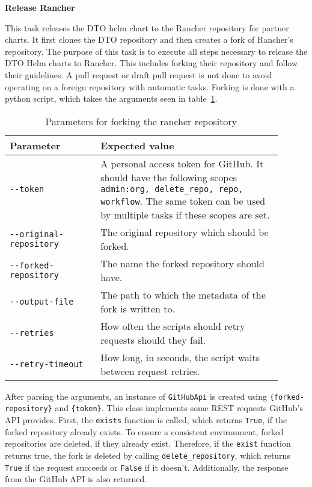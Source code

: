\textbf{Release Rancher}

This task releases the DTO helm chart to the Rancher repository for partner charts.
It first clones the DTO repository and then creates a fork of Rancher's repository.
The purpose of this task is to execute all steps necessary to release the DTO Helm charts to Rancher.
This includes forking their repository and follow their guidelines.
A pull request or draft pull request is not done to avoid operating on a foreign repository with automatic tasks.
Forking is done with a python script, which takes the arguments seen in table~\ref{tab:parameters-for-forking-the-rancher-repository}.

\begin{table}[h]
    \centering
    \caption{Parameters for forking the rancher repository}
    \label{tab:parameters-for-forking-the-rancher-repository}
    \begin{tabular}{p{0.3\linewidth}|p{0.6\linewidth}}
        Parameter & Expected value \\
        \hline
        \verb|--token| & A personal access token for GitHub.
            It should have the following scopes \verb|admin:org, delete_repo, repo, workflow|.
            The same token can be used by multiple tasks if these scopes are set. \\
        \verb|--original-repository| & The original repository which should be forked. \\
        \verb|--forked-repository| & The name the forked repository should have. \\
        \verb|--output-file| & The path to which the metadata of the fork is written to. \\
        \verb|--retries| & How often the scripts should retry requests should they fail. \\
        \verb|--retry-timeout| & How long, in seconds, the script waits between request retries. \\
    \end{tabular}
\end{table}

\pagebreak

After parsing the arguments, an instance of \verb|GitHubApi| is created using \verb|{forked-repository}| and \verb|{token}|.
This class implements some REST requests GitHub's API provides.
First, the \verb|exists| function is called, which returns \verb|True|, if the forked repository already exists.
To ensure a consistent environment, forked repositories are deleted, if they already exist.
Therefore, if the \verb|exist| function returns true, the fork is deleted by calling \verb|delete_repository|, which returns \verb|True| if the request succeeds or \verb|False| if it doesn't.
Additionally, the response from the GitHub API is also returned.

